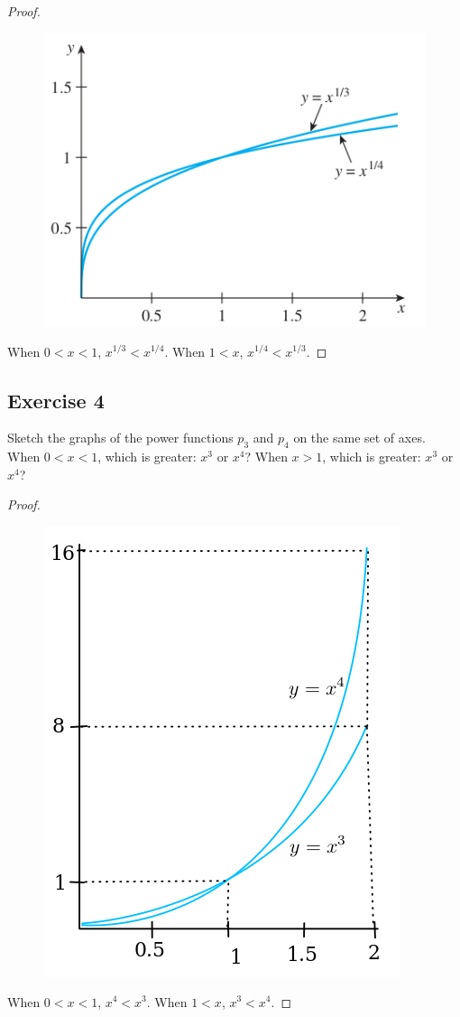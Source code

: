 \documentclass[14pt]{extarticle}
\begin{document}
\begin{proof}
    \begin{figure}[ht!]
        \centering
        \includegraphics[scale=0.5]{../images/11.1.3.png}
    \end{figure}
    When \(0 < x < 1\), \(x^{1/3} < x^{1/4}\). When \(1 < x\), \(x^{1/4} < x^{1/3}\).
\end{proof}

\subsection{Exercise 4}
Sketch the graphs of the power functions \(p_3\) and \(p_4\) on the same set of axes. When \(0 < x < 1\), which is greater:
\(x^3\) or \(x^4\)? When \(x > 1\), which is greater: \(x^3\) or \(x^4\)?

\begin{proof}
    \begin{figure}[ht!]
        \centering
        \includegraphics[scale=0.4]{../images/11.1.4.png}
    \end{figure}
    When \(0 < x < 1\), \(x^4 < x^3\). When \(1 < x\), \(x^3 < x^4\).
\end{proof}
\end{document}
